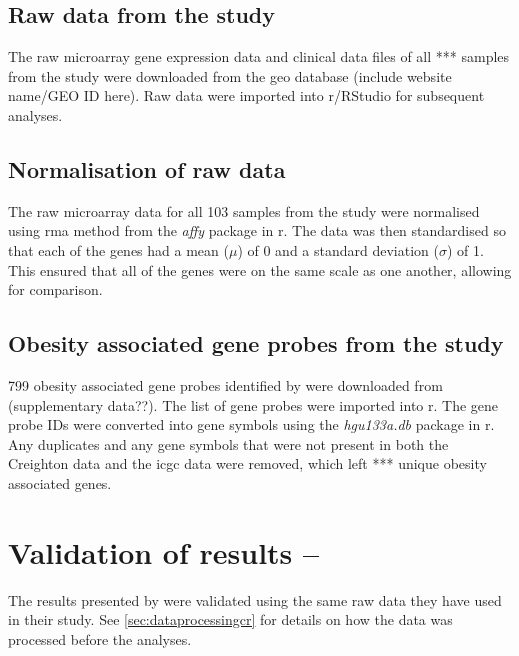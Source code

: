 \subsection{Raw data from the \citet{Creighton2012} study}
\label{subsec:rawdatacr}

The raw microarray gene expression data and clinical data files of all *** samples from the \citet{Creighton2012} study were downloaded from the \gls{geo} database (include website name/GEO ID here).
Raw data were imported into \gls{r}/RStudio for subsequent analyses.



\subsection{Normalisation of raw \citet{Creighton2012} data}
\label{subsec:normcrdata}

The raw microarray data for all 103 samples from the study were normalised using \gls{rma} method from the \textit{affy} package in \gls{r}.
The data was then standardised so that each of the genes had a mean ($\mu$) of 0 and a standard deviation ($\sigma$) of 1.
This ensured that all of the genes were on the same scale as one another, allowing for comparison.

\subsection{Obesity associated gene probes from the \citet{Creighton2012} study}
\label{subsec:crobsgene}

799 obesity associated gene probes identified by \citet{Creighton2012} were downloaded from (supplementary data??).
The list of gene probes were imported into \gls{r}.
The gene probe IDs were converted into gene symbols using the \textit{hgu133a.db} package in \gls{r}.
Any duplicates and any gene symbols that were not present in both the Creighton data and the \gls{icgc} data were removed, which left *** unique obesity associated genes.

\section{Validation of results -- \citet{Creighton2012}}
\label{sec:valresultscr}

The results presented by \citet{Creighton2012} were validated using the same raw data they have used in their study.
See  \cref{sec:dataprocessingcr} for details on how the data was processed before the analyses.

